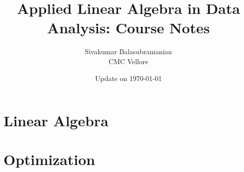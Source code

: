\documentclass[8pt,twoside]{book}
\begin{document}
\title{\bf \huge Applied Linear Algebra in Data Analysis: Course Notes}
\author{Sivakumar Balasubramanian \\ CMC Vellore}
\date{Update on \today}
\maketitle
\setcounter{tocdepth}{2}
\setcounter{minitocdepth}{1} 

\begin{multicols}{2}
    \dominitoc%
    \adjustmtc[2]%
    \tableofcontents
    \label{toc-contents}
\end{multicols}

\listoffigures

\printglossary


% 

\part{Linear Algebra}






\part{Optimization}
\end{document}
